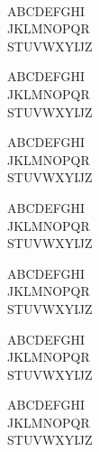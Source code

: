 \documentclass{memoir}
\begin{document}
\begin{multicols}{2}
\strut\\
\hspace{-16mm}{\HUGE NEUDE}



{\miniscule
\noindent ABCDEFGHI\\
JKLMNOPQR\\
STUVWXYĲZ\\}

{\tiny
\noindent ABCDEFGHI\\
JKLMNOPQR\\
STUVWXYĲZ\\}

{\scriptsize
\noindent ABCDEFGHI\\
JKLMNOPQR\\
STUVWXYĲZ\\}

{\footnotesize
\noindent ABCDEFGHI\\
JKLMNOPQR\\
STUVWXYĲZ\\}

{\small
\noindent ABCDEFGHI\\
JKLMNOPQR\\
STUVWXYĲZ\\}

{\normalsize
\noindent ABCDEFGHI\\
JKLMNOPQR\\
STUVWXYĲZ\\}

{\large
\noindent ABCDEFGHI\\
JKLMNOPQR\\
STUVWXYĲZ\\}


\end{multicols}
\end{document}
